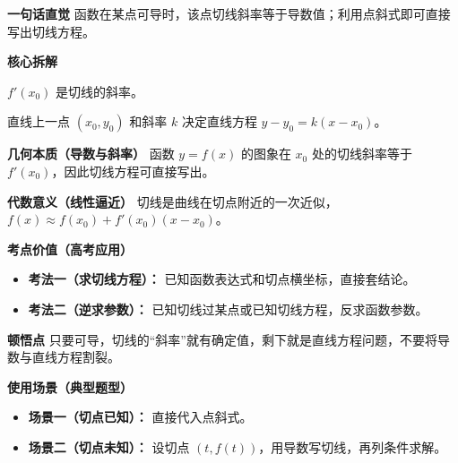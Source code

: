 \begin{explanationbox}
	\textbf{\textcolor{CExplanation}{一句话直觉}}
	函数在某点可导时，该点切线斜率等于导数值；利用点斜式即可直接写出切线方程。

	\medskip
	\textbf{\textcolor{CExplanation}{核心拆解}}
	\begin{description}[style=nextline, leftmargin=2.8em, labelsep=0.5em, itemsep=0.45em]
		\item[\textbf{要点一（斜率即导数）：}]
			$f'(x_0)$ 是切线的斜率。
		\item[\textbf{要点二（点斜式结构）：}]
			直线上一点 $(x_0, y_0)$ 和斜率 $k$ 决定直线方程 $y - y_0 = k(x - x_0)$。
	\end{description}

	\medskip
	\textbf{\textcolor{CExplanation}{几何本质（导数与斜率）}}
	函数 $y=f(x)$ 的图象在 $x_0$ 处的切线斜率等于 $f'(x_0)$，因此切线方程可直接写出。

	\medskip
	\textbf{\textcolor{CExplanation}{代数意义（线性逼近）}}
	切线是曲线在切点附近的一次近似，$f(x) \approx f(x_0) + f'(x_0)(x - x_0)$。

	\medskip
	\textbf{\textcolor{CExplanation}{考点价值（高考应用）}}
	\begin{itemize}[leftmargin=*, itemsep=0.5em, topsep=0.4em]
		\item \textbf{考法一（求切线方程）：} 已知函数表达式和切点横坐标，直接套结论。
		\item \textbf{考法二（逆求参数）：} 已知切线过某点或已知切线方程，反求函数参数。
	\end{itemize}

	\medskip
	\textbf{\textcolor{CExplanation}{顿悟点}}
	只要可导，切线的“斜率”就有确定值，剩下就是直线方程问题，不要将导数与直线方程割裂。

	\medskip
	\textbf{\textcolor{CExplanation}{使用场景（典型题型）}}
	\begin{itemize}[leftmargin=*, itemsep=0.5em, topsep=0.4em]
		\item \textbf{场景一（切点已知）：} 直接代入点斜式。
		\item \textbf{场景二（切点未知）：} 设切点 $(t, f(t))$，用导数写切线，再列条件求解。
	\end{itemize}

\end{explanationbox}
